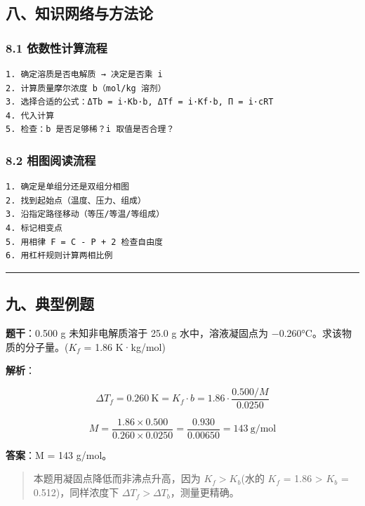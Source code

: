 \subsection{八、知识网络与方法论}\label{ux516bux77e5ux8bc6ux7f51ux7edcux4e0eux65b9ux6cd5ux8bba}

\subsubsection{8.1 依数性计算流程}\label{ux4f9dux6570ux6027ux8ba1ux7b97ux6d41ux7a0b}

\begin{verbatim}
1. 确定溶质是否电解质 → 决定是否乘 i
2. 计算质量摩尔浓度 b（mol/kg 溶剂）
3. 选择合适的公式：ΔTb = i·Kb·b, ΔTf = i·Kf·b, Π = i·cRT
4. 代入计算
5. 检查：b 是否足够稀？i 取值是否合理？
\end{verbatim}

\subsubsection{8.2 相图阅读流程}\label{ux76f8ux56feux9605ux8bfbux6d41ux7a0b}

\begin{verbatim}
1. 确定是单组分还是双组分相图
2. 找到起始点（温度、压力、组成）
3. 沿指定路径移动（等压/等温/等组成）
4. 标记相变点
5. 用相律 F = C - P + 2 检查自由度
6. 用杠杆规则计算两相比例
\end{verbatim}

\begin{center}\rule{0.5\linewidth}{0.5pt}\end{center}

\subsection{九、典型例题}\label{ux4e5dux5178ux578bux4f8bux9898}

\textbf{题干}：0.500 g 未知非电解质溶于 25.0 g 水中，溶液凝固点为 −0.260°C。求该物质的分子量。(\(K_f\) = 1.86 K·kg/mol)

\textbf{解析}：

\[\Delta T_f = 0.260\ \mathrm{K} = K_f \cdot b = 1.86 \cdot \frac{0.500/M}{0.0250}\]

\[M = \frac{1.86 \times 0.500}{0.260 \times 0.0250} = \frac{0.930}{0.00650} = 143\ \mathrm{g/mol}\]

\textbf{答案}：M = 143 g/mol。

\begin{quote}
本题用凝固点降低而非沸点升高，因为 \(K_f > K_b\)(水的 \(K_f\) = 1.86 \textgreater{} \(K_b\) = 0.512)，同样浓度下 \(\Delta T_f > \Delta T_b\)，测量更精确。
\end{quote}


